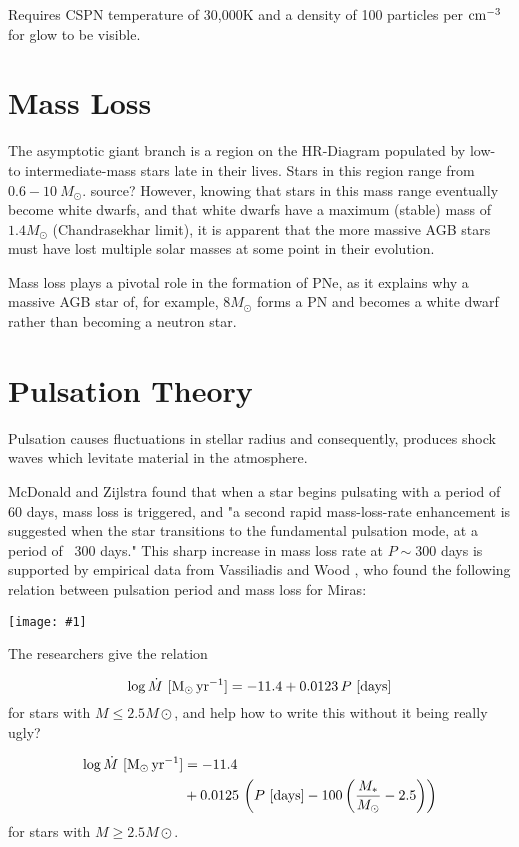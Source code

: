 \documentclass[a4paper,11pt,twocolumn]{article}
\newcommand{\fig}[1]{\centerline{\texttt{[image: \#1]}}}
\begin{document}
Requires CSPN temperature of 30,000K and a density of 100 particles per ${\rm cm^{-3}}$ for glow to be visible.

\section{Mass Loss}

The asymptotic giant branch is a region on the HR-Diagram populated by low- to intermediate-mass stars late in their lives. Stars in this region range from $0.6-10~M_\odot$. {\huge source?} However, knowing that stars in this mass range eventually become white dwarfs, and that white dwarfs have a maximum (stable) mass of $1.4 M_\odot$ (Chandrasekhar limit), it is apparent that the more massive AGB stars must have lost multiple solar masses at some point in their evolution. 

Mass loss plays a pivotal role in the formation of PNe, as it explains why a massive AGB star of, for example, $8 M_\odot$ forms a PN and becomes a white dwarf rather than becoming a neutron star. 

\section{Pulsation Theory}

Pulsation causes fluctuations in stellar radius and consequently, produces shock waves which levitate material in the atmosphere. 

McDonald and Zijlstra found that when a star begins pulsating with a period of 60 days, mass loss is triggered, and "a second rapid mass-loss-rate enhancement is suggested when the star transitions to the fundamental pulsation mode, at a period of ~300 days."\cite{mcdonald} This sharp increase in mass loss rate at $P\sim 300$ days is supported by empirical data from Vassiliadis and Wood \cite{wood}, who found the following relation between pulsation period and mass loss for Miras:

\fig{pulsation_massloss}


The {\huge researchers} give the relation 

\begin{equation*}
    \log \dot M~{[\rm M_\odot\,yr^{-1}]} = -11.4 + 0.0123\,P~{[\rm days]}
\end{equation*}
for stars with $M\leq 2.5M\odot$, and {\huge help how to write this without it being really ugly?}

\begin{align*}
    \log \dot M~{[\rm M_\odot\,yr^{-1}]} &= -11.4 \\
                                         &+ 0.0125\,\left(P~{[\rm days]} - 100\left(\frac{M_*}{M_\odot} - 2.5\right)\right)
\end{align*}
for stars with $M\geq 2.5M\odot$. 
\end{document}
